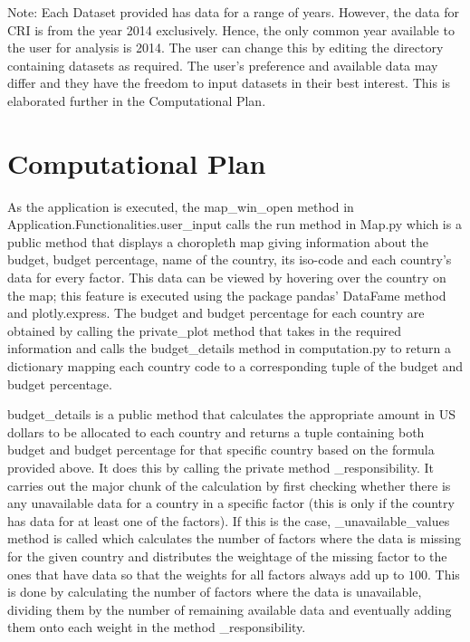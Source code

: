 \documentclass[fontsize=11pt]{article}
\begin{document}
    Note: Each Dataset provided has data for a range of years. However, the data for CRI is from the year 2014 exclusively. Hence, the only common year available to the user for analysis is 2014. The user can change this by editing the directory containing datasets as required. The user’s preference and available data may differ and they have the freedom to input datasets in their best interest. This is elaborated further in the Computational Plan.


\section*{Computational Plan}
As the application is executed, the map_win_open method in Application.Functionalities.user_input calls the run
method in Map.py which is a public method that displays a choropleth map giving information about the
budget, budget percentage, name of the country, its iso-code and each country’s data for every
factor. This data can be viewed by hovering over the country on the map; this feature is executed
using the package pandas’ DataFame method and plotly.express. The budget and budget percentage for each
country are obtained by calling the private_plot method that takes in the required information and
calls the budget_details method in computation.py to return a dictionary mapping each country code to a
corresponding tuple of the budget and budget percentage.\newline

budget_details is a public method that calculates the appropriate amount in US dollars to be allocated to
each country and returns a tuple containing both budget and budget percentage for that specific country
based on the formula provided above. It does this by calling the private method _responsibility. It carries out
the major chunk of the calculation by first checking whether there is any unavailable data for a country in a
specific factor (this is only if the country has data for at least one of the factors). If this is the
case, _unavailable_values method is called which calculates the number of factors where the data is missing
for the given country and distributes the weightage of the missing factor to the ones that have data so
that the weights for all factors always add up to $100$. This is done by calculating the number of factors
where the data is unavailable, dividing them by the number of remaining available data and eventually
adding them onto each weight in the method _responsibility. \newline
\end{document}
